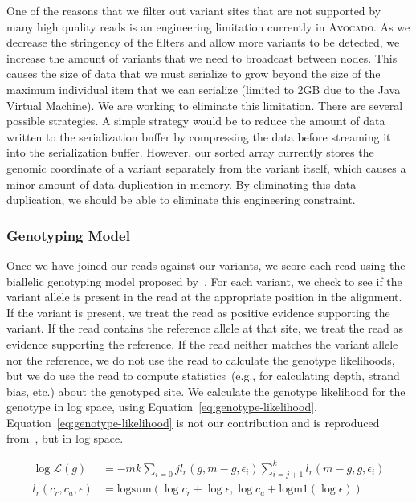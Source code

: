\documentclass{bioinfo}
\begin{document}
\begin{methods}
One of the reasons that we filter out variant sites that are not supported
by many high quality reads is an engineering limitation currently in
\textsc{Avocado}. As we decrease the stringency of the filters and allow
more variants to be detected, we increase the amount of variants that we
need to broadcast between nodes. This causes the size of data that we
must serialize to grow beyond the size of the maximum individual item
that we can serialize (limited to 2GB due to the Java Virtual Machine).
We are working to eliminate this limitation. There are several possible
strategies. A simple strategy would be to reduce the amount of data written
to the serialization buffer by compressing the data before streaming it
into the serialization buffer. However, our sorted array currently
stores the genomic coordinate of a variant separately from the variant
itself, which causes a minor amount of data duplication in memory. By
eliminating this data duplication, we should be able to eliminate this
engineering constraint.

\subsubsection{Genotyping Model}
\label{sec:genotyping-model}

Once we have joined our reads against our variants, we score each read using
the biallelic genotyping model proposed by~\citet{li11}. For each variant, we
check to see if the variant allele is present in the read at the appropriate
position in the alignment. If the variant is present, we treat the read as positive
evidence supporting the variant. If the read contains the reference allele at
that site, we treat the read as evidence supporting the reference. If the read
neither matches the variant allele nor the reference, we do not use the read
to calculate the genotype likelihoods, but we do use the read to compute
statistics~(e.g., for calculating depth, strand bias, etc.) about the genotyped
site. We calculate the genotype likelihood for the genotype in log space, using
Equation~\eqref{eq:genotype-likelihood}. Equation~\eqref{eq:genotype-likelihood}
is not our contribution and is reproduced from~\citet{li11}, but in log space.

\begin{align}
\label{eq:genotype-likelihood}
\log \mathcal{L}(g) &= -m k \sum_{i = 0}{j} l_r(g, m - g, \epsilon_i) \sum_{i = j + 1}^k l_r(m - g, g, \epsilon_i) \\
l_r(c_r, c_a, \epsilon) &= \text{logsum}(\log c_r + \log \epsilon, \log c_a + \text{logm1}(\log \epsilon))
\end{align}


\end{methods}
\end{document}

